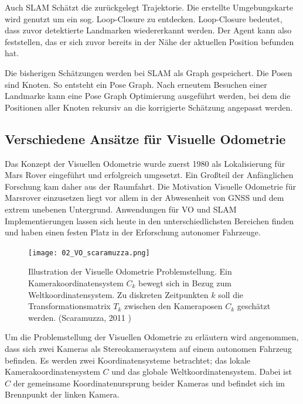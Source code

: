 Auch SLAM Schätzt die zurückgelegt Trajektorie. Die erstellte Umgebungskarte wird genutzt um ein sog. Loop-Closure zu entdecken. Loop-Closure bedeutet, dass zuvor detektierte Landmarken wiedererkannt werden. Der Agent kann also feststellen, das er sich zuvor bereits in der Nähe der aktuellen Position befunden hat.

Die bisherigen Schätzungen werden bei SLAM als Graph gespeichert. Die Posen sind Knoten. So entsteht ein Pose Graph. Nach erneutem Besuchen einer Landmarke kann eine Pose Graph Optimierung ausgeführt werden, bei dem die Positionen aller Knoten rekursiv an die korrigierte Schätzung angepasst werden.

\subsection{Verschiedene Ansätze für Visuelle Odometrie}
Das Konzept der Visuellen Odometrie wurde zuerst 1980 als Lokalisierung für Mars Rover eingeführt und erfolgreich umgesetzt. Ein Gro{\ss}teil der Anfänglichen Forschung kam daher aus der Raumfahrt. Die Motivation Visuelle Odometrie für Marsrover einzusetzen liegt vor allem in der Abwesenheit von GNSS und dem extrem unebenen Untergrund. Anwendungen für VO und SLAM Implementierungen lassen sich heute in den unterschiedlichsten Bereichen finden und haben einen festen Platz in der Erforschung autonomer Fahrzeuge.
\newline

\begin{center}
    \begin{figure}[h!]
    	\centering
    	\texttt{[image: 02\_VO\_scaramuzza.png]}
    	\caption[Visuelle Odometrie Problemstellung]{Illustration der Visuelle Odometrie Problemstellung. Ein Kamerakoordinatensystem $C_{k}$ bewegt sich in Bezug zum Weltkoordinatensystem. Zu diskreten Zeitpunkten $k$ soll die Transformationsmatrix $T_{k}$ zwischen den Kameraposen $C_{k}$ geschätzt werden. (Scaramuzza, 2011 \cite{ScFrVO})}
    	\label{fig:voproblem}
    \end{figure}
\end{center}
Um die Problemstellung der Visuellen Odometrie zu erläutern wird angenommen, dass sich zwei Kameras als Stereokamerasystem auf einem autonomen Fahrzeug befinden. Es werden zwei Koordinatensysteme betrachtet; das lokale Kamerakoordinatensystem $C$ und das globale Weltkoordinatensystem. Dabei ist $C$ der gemeinsame Koordinatenursprung beider Kameras und befindet sich im Brennpunkt der linken Kamera.


